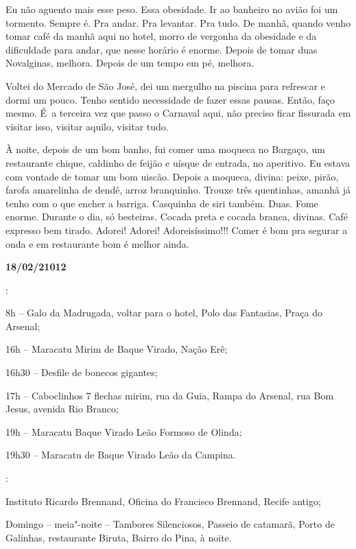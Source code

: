 Eu não aguento mais esse peso. Essa obesidade. Ir ao banheiro no avião
foi um tormento. Sempre é. Pra andar. Pra levantar. Pra tudo. De manhã,
quando venho tomar café da manhã aqui no hotel, morro de vergonha da
obesidade e da dificuldade para andar, que nesse horário é enorme.
Depois de tomar duas Novalginas, melhora. Depois de um tempo em pé,
melhora.

Voltei do Mercado de São José, dei um mergulho na piscina para refrescar
e dormi um pouco. Tenho sentido necessidade de fazer essas pausas.
Então, faço mesmo. É~a terceira vez que passo o Carnaval aqui, não
preciso ficar fissurada em visitar isso, visitar aquilo, visitar tudo.

À noite, depois de um bom banho, fui comer uma moqueca no Bargaço, um
restaurante chique, caldinho de feijão e uísque de entrada, no
aperitivo. Eu estava com vontade de tomar um bom uiscão. Depois a
moqueca, divina: peixe, pirão, farofa amarelinha de dendê, arroz
branquinho. Trouxe três quentinhas, amanhã já tenho com o que encher a
barriga. Casquinha de siri também. Duas. Fome enorme. Durante o dia, só
besteiras. Cocada preta e cocada branca, divinas. Café expresso bem
tirado. Adorei! Adorei! Adoreisíssimo!!! Comer é bom pra segurar a onda
e em restaurante bom é melhor ainda.

\begin{center}\asterisc{}\end{center}

\begin{flushright}\textbf{18/02/21012}\end{flushright}


:

8h -- Galo da Madrugada, voltar para o hotel, Polo das Fantasias, Praça
do Arsenal;

16h -- Maracatu Mirim de Baque Virado, Nação Erê;

16h30 -- Desfile de bonecos gigantes;

17h -- Caboclinhos 7 flechas mirim, rua da Guia, Rampa do Arsenal, rua
Bom Jesus, avenida Rio Branco;

19h -- Maracatu Baque Virado Leão Formoso de Olinda;

19h30 -- Maracatu de Baque Virado Leão da Campina.

:

Instituto Ricardo Brennand, Oficina do Francisco Brennand, Recife
antigo;

Domingo -- meia"-noite -- Tambores Silenciosos, Passeio de catamarã,
Porto de Galinhas, restaurante Biruta, Bairro do Pina, à noite.

